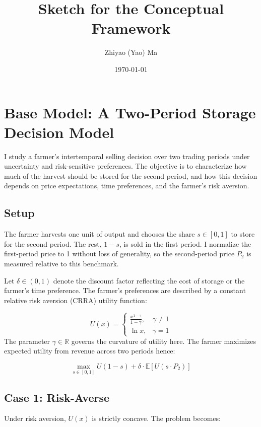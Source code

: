 \documentclass[12pt]{article}
\title{Sketch for the Conceptual Framework}
\author[1]{Zhiyao (Yao) Ma}
\affil[1]{UC Davis}
\date{\today}
\begin{document}
\maketitle
\tableofcontents
\newpage

\section{Base Model: A Two-Period Storage Decision Model}

I study a farmer's intertemporal selling decision over two trading periods under uncertainty and risk-sensitive preferences. The objective is to characterize how much of the harvest should be stored for the second period, and how this decision depends on price expectations, time preferences, and the farmer's risk aversion.

\subsection{Setup}

The farmer harvests one unit of output and chooses the share \( s \in [0,1] \) to store for the second period. The rest, \( 1 - s \), is sold in the first period. I normalize the first-period price to 1 without loss of generality, so the second-period price \( P_2 \) is measured relative to this benchmark.

Let \( \delta \in (0,1) \) denote the discount factor reflecting the cost of storage or the farmer’s time preference. The farmer's preferences are described by a constant relative risk aversion (CRRA) utility function:

\[
U(x) = 
\begin{cases}
\frac{x^{1 - \gamma}}{1 - \gamma}, & \gamma \neq 1 \\
\ln x, & \gamma = 1
\end{cases}
\]
The parameter \( \gamma \in \mathbb{R} \) governs the curvature of utility here. The farmer maximizes expected utility from revenue across two periods hence:

\[
\max_{s \in [0,1]}  U(1 - s) + \delta \cdot \mathbb{E} \left[ U(s \cdot P_2) \right] 
\]

\subsection{Case 1: Risk-Averse}
Under risk aversion, \( U(x) \) is strictly concave. The problem becomes:
\end{document}
